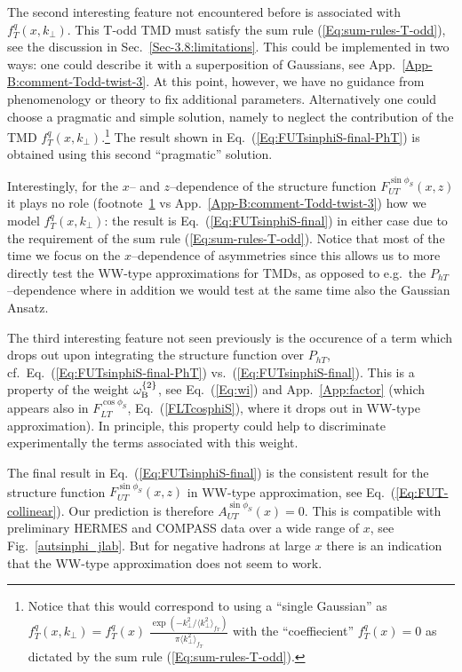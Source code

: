 \documentclass[a4paper,11pt]{article}
\newcommand{\blue}[1]{{\color{blue} #1}}
\newcommand{\la}{\langle}
\newcommand{\ra}{\rangle}
\newcommand{\ps}[1]{\blue{ #1}}
\def\Phperp{P_{hT}}
\def\kperp{k_\perp}
\begin{document}
The second interesting feature not encountered before is 
associated with $f_T^q(x,\kperp)$. This T-odd TMD must 
satisfy the sum rule (\ref{Eq:sum-rules-T-odd}), see the
discussion in Sec.~\ref{Sec-3.8:limitations}. This could be
implemented in two ways: one could describe it with a superposition 
of Gaussians, see App.~\ref{App-B:comment-Todd-twist-3}.
At this point, however, we have no guidance from phenomenology or theory 
to fix additional parameters. Alternatively one could choose a pragmatic 
and simple solution, namely to neglect the contribution of the TMD
$f_T^q(x,\kperp)$.\footnote{\label{Footnote:fT-single-Gauss} Notice 
	that this would correspond to using a ``single Gaussian'' as 
	$f_T^q(x,\kperp) = f_T^q(x)\;
	\frac{\exp(-\kperp^2/\la\kperp^2\ra_{f_T}^{ })}
	{\pi\la\kperp^2\ra_{f_T}^{ }}$
	with the ``coeffiecient'' $f_T^q(x)=0$ as dictated 
	by the sum rule (\ref{Eq:sum-rules-T-odd}).}
The result shown in Eq.~(\ref{Eq:FUTsinphiS-final-PhT})
is obtained using this second ``pragmatic'' solution.

Interestingly, for the $x$-- and $z$--dependence of the
structure function $F_{UT}^{\sin\phi_S}(x,z)$ it plays no role
(footnote~\ref{Footnote:fT-single-Gauss} 
vs App.~\ref{App-B:comment-Todd-twist-3}) how we model $f_T^q(x,\kperp)$: 
the result is Eq.~(\ref{Eq:FUTsinphiS-final}) in either case due to the 
requirement of the sum rule (\ref{Eq:sum-rules-T-odd}).
Notice that most of the time we focus on the $x$--dependence of 
asymmetries since this allows us to more directly test the WW-type 
approximations for TMDs, as opposed to e.g.\ the $P_{hT}$--dependence 
where in addition we would test at the same time also the Gaussian Ansatz.

The third interesting feature not seen previously is the occurence of a 
term which drops out upon integrating the structure function over $\Phperp$, 
cf.\ Eq.~(\ref{Eq:FUTsinphiS-final-PhT}) vs.\ (\ref{Eq:FUTsinphiS-final}).
This is a property of the weight $\omega^{\{2\}}_{\rm B}$, see 
Eq.~(\ref{Eq:wi}) and App.~\ref{App:factor} (which appears also in 
$F_{LT}^{\cos\phi_S}$, Eq.~(\ref{FLTcosphiS}), where it drops
out in WW-type approximation). In principle, this property could  help to 
discriminate experimentally the terms associated with this weight.

The final result in Eq.~(\ref{Eq:FUTsinphiS-final}) is the
consistent result for the structure function $F_{UT}^{\sin\phi_S}(x,z)$ in 
WW-type approximation, see Eq.~(\ref{Eq:FUT-collinear}). Our prediction 
is therefore $A_{UT}^{\sin\phi_S}(x)=0$.
\ps{This is compatible with preliminary HERMES \cite{Schnell:2010zza}
and COMPASS \cite{Parsamyan:2015dfa} data over a wide range of $x$, 
see Fig.~\ref{autsinphi_jlab}. But for negative hadrons at large $x$ 
there is an indication that the WW-type approximation does not seem
to work.}
\end{document}
